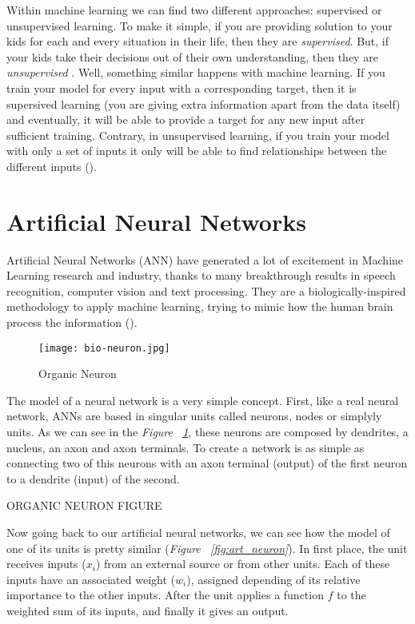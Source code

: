 Within machine learning we can find two different approaches: supervised or unsupervised learning. To make it simple, if you are providing solution to your kids for each and every situation in their life, then they are \textit{supervised}. But, if your kids take their decisions out of their own understanding, then they are \textit{unsupervised} . Well, something similar happens with machine learning. If you train your model for every input with a corresponding target, then it is supersived learning (you are giving extra information apart from the data itself) and eventually, it will be able to provide a target for any new input after sufficient training. Contrary, in unsupervised learning, if you train your model with only a set of inputs it only will be able to find relationships between the different inputs (\cite{sup_unsup_learning}). 

\section{Artificial Neural Networks}
Artificial Neural Networks (ANN) have generated a lot of excitement in Machine Learning research and industry, thanks to many breakthrough results in speech recognition, computer vision and text processing. They are a biologically-inspired methodology to apply machine learning, trying to mimic how the human brain process the information (\cite{intro_ann}). 

\begin{figure}[h!b]
	\centering
	\texttt{[image: bio-neuron.jpg]}
	\caption{Organic Neuron}
	\label{fig:org_neuron}
\end{figure}

The model of a neural network is a very simple concept. First, like a real neural network, ANNs are based in singular units called neurons, nodes or simplyly units. As we can see in the \textit{Figure ~\ref{fig:org_neuron}}, these neurons are composed by dendrites, a nucleus, an axon and axon terminals. To create a network is as simple as connecting two of this neurons with an axon terminal (output) of the first neuron to a dendrite (input) of the second.

ORGANIC NEURON FIGURE

Now going back to our artificial neural networks, we can see how the model of one of its units is pretty similar (\textit{Figure ~\ref{fig:art_neuron}}). In first place, the unit receives inputs ($x_i$) from an external source or from other units. Each of these inputs have an associated weight ($w_i$), assigned depending of its relative importance to the other inputs. After the unit applies a function $f$ to the weighted sum of its inputs, and finally it gives an output.

